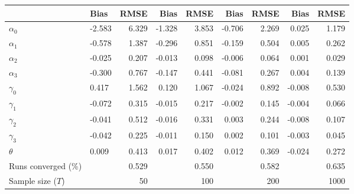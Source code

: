 
\begin{tabular}[t]{llrrrrrrr}
\toprule
  & Bias & RMSE & Bias & RMSE & Bias & RMSE & Bias & RMSE\\
\midrule
$\alpha_{0}$ & -2.583 & 6.329 & -1.328 & 3.853 & -0.706 & 2.269 & 0.025 & 1.179\\
$\alpha_{1}$ & -0.578 & 1.387 & -0.296 & 0.851 & -0.159 & 0.504 & 0.005 & 0.262\\
$\alpha_{2}$ & -0.025 & 0.207 & -0.013 & 0.098 & -0.006 & 0.064 & 0.001 & 0.029\\
$\alpha_{3}$ & -0.300 & 0.767 & -0.147 & 0.441 & -0.081 & 0.267 & 0.004 & 0.139\\
$\gamma_{0}$ & 0.417 & 1.562 & 0.120 & 1.067 & -0.024 & 0.892 & -0.008 & 0.530\\
$\gamma_{1}$ & -0.072 & 0.315 & -0.015 & 0.217 & -0.002 & 0.145 & -0.004 & 0.066\\
$\gamma_{2}$ & -0.041 & 0.512 & -0.016 & 0.331 & 0.003 & 0.244 & -0.008 & 0.107\\
$\gamma_{3}$ & -0.042 & 0.225 & -0.011 & 0.150 & 0.002 & 0.101 & -0.003 & 0.045\\
$\theta$ & 0.009 & 0.413 & 0.017 & 0.402 & 0.012 & 0.369 & -0.024 & 0.272\\
Runs converged (\%) &  & 0.529 &  & 0.550 &  & 0.582 &  & 0.635\\
Sample size ($T$) &  & 50 &  & 100 &  & 200 &  & 1000\\
\bottomrule
\end{tabular}
